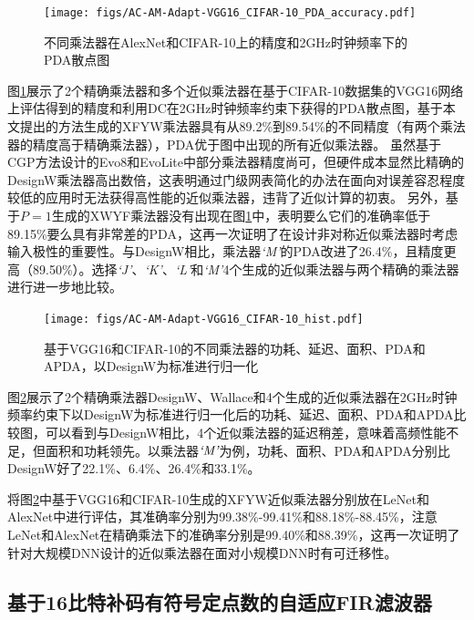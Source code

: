 \begin{figure}[!htb]
    \centering
    \texttt{[image: figs/AC-AM-Adapt-VGG16\_CIFAR-10\_PDA\_accuracy.pdf]}
    \caption{不同乘法器在AlexNet和CIFAR-10上的精度和2GHz时钟频率下的PDA散点图}
    \label{AC:AM:Adapt:Fig:VGG16_CIFAR-10_PDA_accuracy}
\end{figure}

图\ref{AC:AM:Adapt:Fig:VGG16_CIFAR-10_PDA_accuracy}展示了2个精确乘法器和多个近似乘法器在基于CIFAR-10\cite{DNN:CIFAR-10}数据集的VGG16网络\cite{DNN:AlexNet}上评估得到的精度和利用DC在2GHz时钟频率约束下获得的PDA散点图，基于本文提出的方法生成的XFYW乘法器具有从89.2\%到89.54\%的不同精度（有两个乘法器的精度高于精确乘法器），PDA优于图中出现的所有近似乘法器。
虽然基于CGP方法设计的Evo8\cite{AC:AM:CGP_Evoapprox8b}和EvoLite\cite{AC:AM:CGP_EvoLite}中部分乘法器精度尚可，但硬件成本显然比精确的DesignW乘法器高出数倍，这表明通过门级网表简化的办法在面向对误差容忍程度较低的应用时无法获得高性能的近似乘法器，违背了近似计算的初衷。
另外，基于$P=1$生成的XWYF乘法器没有出现在图\ref{AC:AM:Adapt:Fig:VGG16_CIFAR-10_PDA_accuracy}中，表明要么它们的准确率低于89.15\%要么具有非常差的PDA，这再一次证明了在设计非对称近似乘法器时考虑输入极性的重要性。与DesignW相比，乘法器\emph{`M'}的PDA改进了26.4\%，且精度更高（89.50\%）。选择\emph{`J'}、\emph{`K'}、\emph{`L'}和\emph{`M'}4个生成的近似乘法器与两个精确的乘法器进行进一步地比较。
\begin{figure}[!htb]
    \centering
    \texttt{[image: figs/AC-AM-Adapt-VGG16\_CIFAR-10\_hist.pdf]}
    \caption{基于VGG16和CIFAR-10的不同乘法器的功耗、延迟、面积、PDA和APDA，以DesignW为标准进行归一化}
    \label{AC:AM:Adapt:Fig:VGG16_CIFAR-10_hist}
\end{figure}
图\ref{AC:AM:Adapt:Fig:VGG16_CIFAR-10_hist}展示了2个精确乘法器DesignW、Wallace和4个生成的近似乘法器在2GHz时钟频率约束下以DesignW为标准进行归一化后的功耗、延迟、面积、PDA和APDA比较图，可以看到与DesignW相比，4个近似乘法器的延迟稍差，意味着高频性能不足，但面积和功耗领先。以乘法器$\emph{`M'}$为例，功耗、面积、PDA和APDA分别比DesignW好了22.1\%、6.4\%、26.4\%和33.1\%。

将图\ref{AC:AM:Adapt:Fig:VGG16_CIFAR-10_hist}中基于VGG16和CIFAR-10生成的XFYW近似乘法器分别放在LeNet和AlexNet中进行评估，其准确率分别为99.38\%-99.41\%和88.18\%-88.45\%，注意LeNet和AlexNet在精确乘法下的准确率分别是99.40\%和88.39\%，这再一次证明了针对大规模DNN设计的近似乘法器在面对小规模DNN时有可迁移性。


\subsection{基于16比特补码有符号定点数的自适应FIR滤波器}

